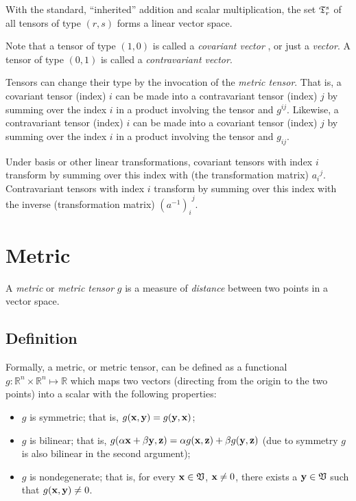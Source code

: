 With the standard, ``inherited'' addition and scalar multiplication,
the set ${\frak T}_r^s$ of all tensors of type $(r,s)$
forms a linear vector space.


Note that a tensor of type $(1,0)$ is called  a
{\em covariant vector}
,
or just a
{\em vector}.
A tensor of type $(0,1)$ is called a
{\em contravariant vector}.

Tensors can change their type by the invocation of the {\em metric tensor}.
That is, a covariant tensor (index) $i$ can be made into a contravariant tensor (index) $j$
by summing over the index $i$ in a product involving the tensor and $g^{ij}$.
Likewise,  a contravariant tensor (index) $i$ can be made into a covariant tensor (index) $j$
by summing over the index $i$ in a product involving the tensor and $g_{ij}$.


Under basis or other linear transformations,
covariant tensors with index $i$ transform by summing over this index with (the transformation matrix) ${a_i}^j$.
Contravariant tensors with index $i$ transform by summing over this index with the inverse (transformation matrix)  ${(a^{-1})_i}^j$.


\section{Metric}

A {\em metric} or {\em metric tensor} $g$ is a measure of {\em distance} between two points in a vector space.




\subsection{Definition}
\label{2011-m-metrict}


Formally, a metric, or metric tensor,  can be defined as a functional $g: \mathbb{R}^n\times\mathbb{R}^n\mapsto \mathbb{R}$
which maps two vectors (directing from the origin to the two points)
into a scalar
with the following properties:
\begin{itemize}
\item
$g$ is symmetric; that is, $g({\bf x},{\bf y})=g({\bf y},{\bf x})$;
\item
$g$ is bilinear; that is,
$g(
\alpha {\bf x} + \beta {\bf y}, {\bf z})
= \alpha g( {\bf x},{\bf z}) + \beta g({\bf y}, {\bf z})
$ (due to symmetry $g$ is also bilinear in the second argument);
\item
$g$ is nondegenerate; that is,
for every ${\bf x}\in {\frak V}$, ${\bf x}\neq 0$, there exists a
${\bf y}\in {\frak V}$ such that $g({\bf x},{\bf y})\neq 0$.
\end{itemize}



